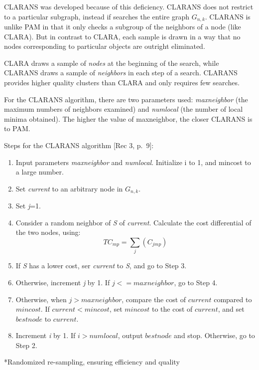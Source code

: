 \documentclass[12pt,twoside]{amherstthesis}
\providecommand{\tightlist}{%
  \setlength{\itemsep}{0pt}\setlength{\parskip}{0pt}}
\begin{document}
  CLARANS was developed because of this deficiency. CLARANS does not
  restrict to a particular subgraph, instead if searches the entire graph
  \(G_{n,k}\). CLARANS is unlike PAM in that it only checks a subgroup of
  the neighbors of a node (like CLARA). But in contrast to CLARA, each
  sample is drawn in a way that no nodes corresponding to particular
  objects are outright eliminated.
  
  CLARA draws a sample of \emph{nodes} at the beginning of the search,
  while CLARANS draws a sample of \emph{neighbors} in each step of a
  search. CLARANS provides higher quality clusters than CLARA and only
  requires few searches.
  
  For the CLARANS algorithm, there are two parameters used:
  \emph{maxneighbor} (the maximum numbers of neighbors examined) and
  \emph{numlocal} (the number of local minima obtained). The higher the
  value of maxneighbor, the closer CLARANS is to PAM.
  
  Steps for the CLARANS algorithm {[}Rec 3, p.~9{]}:
  
  \begin{enumerate}
  \def\labelenumi{\arabic{enumi}.}
  \tightlist
  \item
    Input parameters \emph{maxneighbor} and \emph{numlocal}. Initialize i
    to 1, and mincost to a large number.
  \item
    Set \emph{current} to an arbitrary node in \(G_{n,k}\).
  \item
    Set \emph{j}=1.
  \item
    Consider a random neighbor of \emph{S} of \emph{current}. Calculate
    the cost differential of the two nodes, using:
    \[ TC_{mp} = \sum_j(C_{jmp}) \]
  \item
    If \emph{S} has a lower cost, ser \emph{current} to \emph{S}, and go
    to Step 3.
  \item
    Otherwise, increment \emph{j} by 1. If \(j <= maxneighbor\), go to
    Step 4.
  \item
    Otherwise, when \(j > maxneighbor\), compare the cost of \(current\)
    compared to \(mincost\). If \(current < mincost\), set \(mincost\) to
    the cost of \(current\), and set \(bestnode\) to \(current\).
  \item
    Increment \emph{i} by 1. If \(i> numlocal\), output \(bestnode\) and
    stop. Otherwise, go to Step 2.
  \end{enumerate}
  
  *Randomized re-sampling, ensuring efficiency and quality
  
\end{document}
